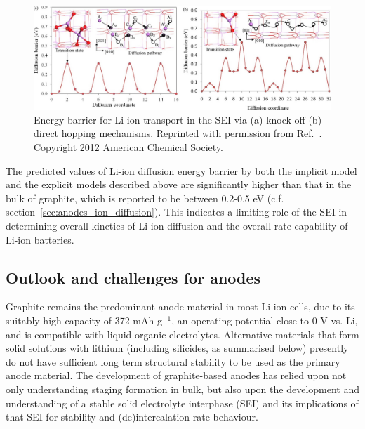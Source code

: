 \documentclass[../main.tex]{subfiles}
\begin{document}
\begin{figure}
    \centering
    \includegraphics[scale=0.5]{figures/sei.jpg}
    \caption{Energy barrier for Li-ion transport in the SEI via (a) knock-off (b) direct hopping mechanisms. Reprinted with permission from Ref.~. Copyright 2012 American Chemical Society.}
    \label{fig:sei}
\end{figure}

The predicted values of Li-ion diffusion energy barrier by both the implicit model and the explicit models described above are significantly higher than that in the bulk of graphite, which is reported to be between 0.2-0.5 eV (c.f. section~\ref{sec:anodes_ion_diffusion}).\cite{thinius2014theoretical, thinius2014theoretical, Hakim, persson2010} This indicates a limiting role of the SEI in determining overall kinetics of Li-ion diffusion and the overall rate-capability of Li-ion batteries.

\subsection{Outlook and challenges for anodes}
Graphite remains the predominant anode material in most Li-ion cells, due to its suitably high capacity of 372 mAh g$^{-1}$, an operating potential close to 0 V vs. Li, and is compatible with liquid organic electrolytes. Alternative materials that form solid solutions with lithium (including silicides, as summarised below) presently do not have sufficient long term structural stability to be used as the primary anode material. The development of graphite-based anodes has relied upon not only understanding staging formation in bulk, but also upon the development and understanding of a stable solid electrolyte interphase (SEI) and its implications of that SEI for stability and (de)intercalation rate behaviour.
\end{document}
